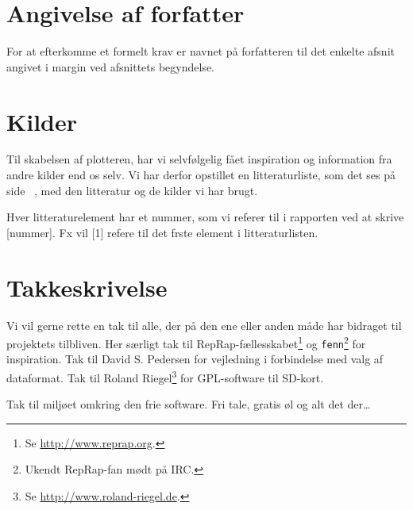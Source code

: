 

\section{Angivelse af forfatter}

For at efterkomme et formelt krav er navnet på forfatteren til det
enkelte afsnit angivet i margin ved afsnittets begyndelse.


\section{Kilder}
Til skabelsen af plotteren, har vi selvfølgelig fået inspiration og
information fra andre kilder end os selv. Vi har derfor opstillet en
litteraturliste, som det ses på side ~\pageref{ch:litteratur}, med den
litteratur og de kilder vi har brugt.

Hver litteraturelement har et nummer, som vi referer til i rapporten
ved at skrive [nummer]. Fx vil [1] refere til det frste element i
litteraturlisten.


\section{Takkeskrivelse}


Vi vil gerne rette en tak til alle, der på den ene eller anden måde
har bidraget til projektets tilbliven. Her særligt tak til
RepRap-fællesskabet\footnote{Se \url{http://www.reprap.org}.} og
\texttt{fenn}\footnote{Ukendt RepRap-fan mødt på IRC.} for
inspiration. Tak til David S. Pedersen for vejledning i forbindelse
med valg af dataformat. Tak til Roland Riegel\footnote{Se
  \url{http://www.roland-riegel.de}.} for GPL-software til SD-kort.

Tak til miljøet omkring den frie software. Fri tale, gratis øl og alt
det der\dots {}


